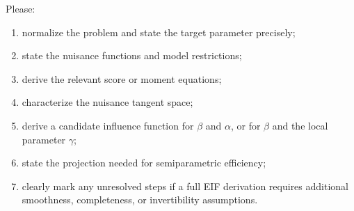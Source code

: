 \documentclass{article}
\begin{document}
Please:

\begin{enumerate}
\item normalize the problem and state the target parameter precisely;
\item state the nuisance functions and model restrictions;
\item derive the relevant score or moment equations;
\item characterize the nuisance tangent space;
\item derive a candidate influence function for \(\beta\) and \(\alpha\), or
      for \(\beta\) and the local parameter \(\gamma\);
\item state the projection needed for semiparametric efficiency;
\item clearly mark any unresolved steps if a full EIF derivation requires
      additional smoothness, completeness, or invertibility assumptions.
\end{enumerate}
\end{document}
